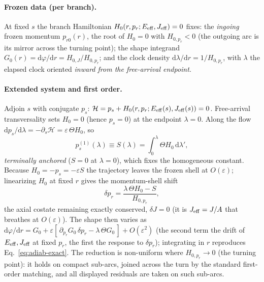 \documentclass[12pt]{iopart}
\newcommand{\dd}{\mathrm{d}}
\begin{document}
\paragraph{Frozen data (per branch).} At fixed $s$ the branch Hamiltonian
$H_0(r,p_r;E_{\rm eff},J_{\rm eff})=0$ fixes: the \emph{ingoing} frozen momentum
$p_{r0}(r)$, the root of $H_0=0$ with $H_{0,p_r}<0$ (the outgoing arc is its mirror
across the turning point); the shape integrand $G_0(r)=\dd\varphi/\dd r=H_{0,J}/H_{0,p_r}$;
and the clock density $\dd\lambda/\dd r=1/H_{0,p_r}$, with $\lambda$ the elapsed clock
oriented \emph{inward from the free-arrival endpoint}.

\paragraph{Extended system and first order.} Adjoin $s$ with conjugate $p_s$:
$\mathcal H=p_s+H_0(r,p_r;E_{\rm eff}(s),J_{\rm eff}(s))=0$. Free-arrival transversality
sets $H_0=0$ (hence $p_s=0$) at the endpoint $\lambda=0$. Along the flow
$\dd p_s/\dd\lambda=-\partial_s\mathcal H=\varepsilon\,\Theta H_0$, so
\begin{equation}
    p_s^{(1)}(\lambda)\equiv S(\lambda)=\int_0^{\lambda}\Theta H_0\,\dd\lambda',
    \label{eq:pS-app}
\end{equation}
\emph{terminally anchored} ($S=0$ at $\lambda=0$), which fixes the homogeneous constant.
Because $H_0=-p_s=-\varepsilon S$ the trajectory leaves the frozen shell at
$O(\varepsilon)$; linearizing $H_0$ at fixed $r$ gives the momentum-shell shift
\begin{equation}
    \delta p_r=\frac{\lambda\,\Theta H_0-S}{H_{0,p_r}},
    \label{eq:dpr-app}
\end{equation}
the axial costate remaining exactly conserved, $\delta J=0$ (it is $J_{\rm eff}=J/A$ that
breathes at $O(\varepsilon)$). The shape then varies as
$\dd\varphi/\dd r=G_0+\varepsilon[\,\partial_{p_r}G_0\,\delta p_r-\lambda\,\Theta G_0\,]
+O(\varepsilon^2)$ (the second term the drift of $E_{\rm eff},J_{\rm eff}$ at fixed
$p_r$, the first the response to $\delta p_r$); integrating in $r$ reproduces
Eq.~\eqref{eq:adiab-exact}. The reduction is non-uniform where $H_{0,p_r}\to0$ (the
turning point): it holds on compact sub-arcs, joined across the turn by the standard
first-order matching, and all displayed residuals are taken on such sub-arcs.
\end{document}
